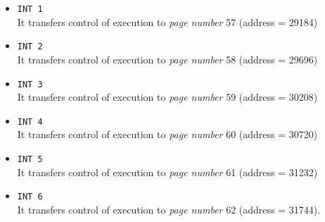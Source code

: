 \documentclass[11pt]{article}
\begin{document}
\begin{itemize}
\item \texttt{INT 1}  \\It transfers control of execution to \textit{page number} 57 (address = 29184)
\item \texttt{INT 2}  \\It transfers control of execution to \textit{page number} 58 (address = 29696)  
\item \texttt{INT 3}  \\It transfers control of execution to \textit{page number} 59 (address = 30208)
\item \texttt{INT 4}  \\It transfers control of execution to \textit{page number}  60 (address = 30720) 
\item \texttt{INT 5}  \\It transfers control of execution to \textit{page number} 61 (address = 31232)
\item \texttt{INT 6}  \\It transfers control of execution to \textit{page number} 62 (address = 31744).\

 
\end{itemize}
\end{document}
